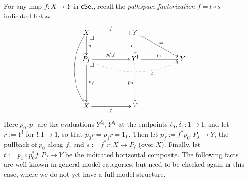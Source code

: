 \documentclass[11pt]{amsart}
\makeatletter
\newcommand{\cSet}{\ensuremath{\mathsf{cSet}}}
\newcommand{\ra}{\ensuremath{\rightarrow}}
\newcommand{\I}{\ensuremath{\mathrm{I}}}
\theoremstyle{remark}
\theoremstyle{definition}
\newcommand{\pbcorner}[1][dr]{\save*!/#1-1.2pc/#1:(-1,1)@^{|-}\restore}
\makeatother
\begin{document}
For any map $f :X\ra Y$ in $\cSet$, recall the \emph{pathspace factorization} $f = t\circ s$ indicated below.
\begin{equation}\label{diag:pathspace factorization}
\xymatrix{
X \ar@/_1.5pc/[ddd]_= \ar[d]^s \ar[rr]^f \pbcorner && Y \ar[d]_r \ar[rrd]^=\\
P_f  \ar[dd]^{p_f} \ar[rr]^{p_0^*f} \ar@{.>}@/_1.5pc/[rrrr]_<<<<<<<<<<<<<<<t \pbcorner && Y^\I \ar[dd]_{p_0} \ar[rr]^-{p_1} && Y \\
\\
X \ar[rr]_f  &&  Y &
}
\end{equation}
Here $p_0, p_1$ are the evaluations $Y^{\delta_{0}}, Y^{\delta_{1}}$ at the endpoints $\delta_0, \delta_1 : 1\ra\I$, and let $r:= Y^!$ for $! : \I\ra 1$, so that $p_0r = p_1r = 1_Y$.  Then let  $p_f := f^*p_0 : P_f \ra Y$, the pullback of $p_0$ along $f$, and $s:= f^*r : X\ra P_f$ (over $X$).  Finally, let $t:= p_1\circ p_0^*f : P_f \ra Y$ be the indicated horizontal composite. 
The following facts are well-known in general model categories, but need to be checked again in this case, where we do not yet have a full model structure.
\end{document}
